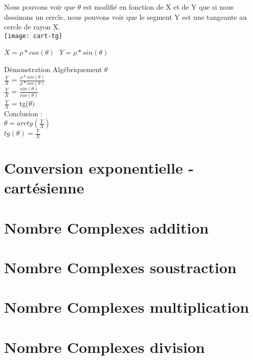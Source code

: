 Nous pouvons voir que $\theta$ est modifié en fonction de X et de Y que si nous dessinons un cercle, nous pouvons voir que le segment Y est une tangeante au cercle de rayon X. \\

\texttt{[image: cart-tg]}

$X=\rho * cos(\theta)$ $ $ $ Y=\rho * sin(\theta)$

\vspace{5mm} %
Démonstration Algébriquement $\theta$ \\

$\frac{Y}{X}$ = $\frac{\rho * sin(\theta)}{\rho * cos(\theta)}$ \\
$\frac{Y}{X}$ = $\frac{sin(\theta)}{cos(\theta)}$ \\
$\frac{Y}{X}$ = tg($\theta)$ \\

\vspace{5mm} %
Conclusion : \\

$\theta = arctg(\frac{Y}{X})$ \\

$tg(\theta) = \frac{Y}{X}$


\newpage

\section{Conversion exponentielle - cartésienne}
\vspace{3mm} %




\section{Nombre Complexes addition}
\vspace{3mm} %



\section{Nombre Complexes soustraction}
\vspace{3mm} %



\section{Nombre Complexes multiplication}
\vspace{3mm} %



\section{Nombre Complexes division}
\vspace{3mm} %

